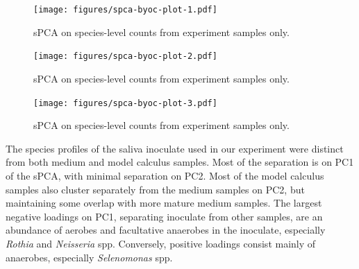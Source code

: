 \documentclass[
]{article}
\begin{document}
\begin{figure}

{\centering \texttt{[image: figures/spca-byoc-plot-1.pdf]}

}

\caption{sPCA on species-level counts from experiment samples only.}

\end{figure}

\begin{figure}

{\centering \texttt{[image: figures/spca-byoc-plot-2.pdf]}

}

\caption{sPCA on species-level counts from experiment samples only.}

\end{figure}

\begin{figure}

{\centering \texttt{[image: figures/spca-byoc-plot-3.pdf]}

}

\caption{sPCA on species-level counts from experiment samples only.}

\end{figure}

The species profiles of the saliva inoculate used in our experiment were
distinct from both medium and model calculus samples. Most of the
separation is on PC1 of the sPCA, with minimal separation on PC2. Most
of the model calculus samples also cluster separately from the medium
samples on PC2, but maintaining some overlap with more mature medium
samples. The largest negative loadings on PC1, separating inoculate from
other samples, are an abundance of aerobes and facultative anaerobes in
the inoculate, especially \emph{Rothia} and \emph{Neisseria} spp.
Conversely, positive loadings consist mainly of anaerobes, especially
\emph{Selenomonas} spp.
\end{document}
